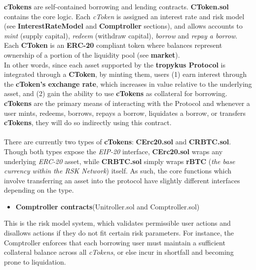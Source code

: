 \documentclass{article}
\begin{document}
\textbf{cTokens} are self-contained borrowing and lending contracts. \textbf{CToken.sol} contains the core logic. Each \textit{cToken} is assigned an interest rate and risk model (see \textbf{InterestRateModel} and \textbf{Comptroller} sections), and allows accounts to \textit{mint} (supply capital), \textit{redeem} (withdraw capital), \textit{borrow} and \textit{repay a borrow}. Each \textbf{CToken} is an \textbf{ERC-20} compliant token where balances represent ownership of a portion of the liquidity pool (see \textbf{market}).
\\
In other words, since each asset supported by the \textbf{tropykus Protocol} is integrated through a \textbf{CToken}, by minting them, users (1) earn interest through the \textbf{cToken's exchange rate}, which increases in value relative to the underlying asset, and (2) gain the ability to use \textbf{cTokens} as collateral for borrowing.\\
\textbf{cTokens} are the primary means of interacting with the Protocol and whenever a user mints, redeems, borrows, repays a borrow, liquidates a borrow, or transfers \textbf{cTokens}, they will do so indirectly using this contract. \\
\\
There are currently two types of \textbf{cTokens}: \textbf{CErc20.sol} and \textbf{CRBTC.sol}. Though both types expose the \textit{EIP-20} interface, \textbf{CErc20.sol} wraps any underlying \textit{ERC-20} asset, while \textbf{CRBTC.sol} simply wraps \textbf{rBTC} (\textit{the base currency within the RSK Network}) itself. As such, the core functions which involve transferring an asset into the protocol have slightly different interfaces depending on the type.

\begin{itemize}
\item \textbf{Comptroller contracts}(Unitroller.sol and Comptroller.sol)
\end{itemize}

This is the risk model system, which validates permissible user actions and disallows actions if they do not fit certain risk parameters. For instance, the Comptroller enforces that each borrowing user must maintain a sufficient collateral balance across all \textit{cTokens}, or else incur in shortfall and becoming prone to liquidation.
\\
\end{document}
